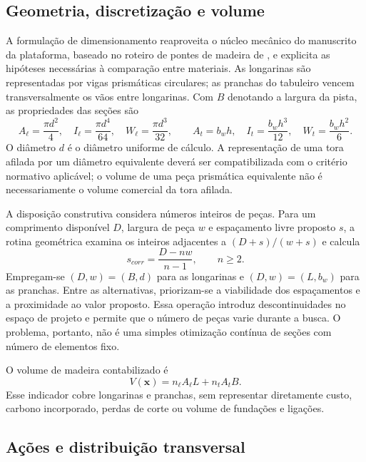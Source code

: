 \subsection{Geometria, discretização e volume}\label{sec:geometria}

A formulação de dimensionamento reaproveita o núcleo mecânico do manuscrito da plataforma, baseado no roteiro de pontes de madeira de \textcite{CALIL2006}, e explicita as hipóteses necessárias à comparação entre materiais. As longarinas são representadas por vigas prismáticas circulares; as pranchas do tabuleiro vencem transversalmente os vãos entre longarinas. Com $B$ denotando a largura da pista, as propriedades das seções são
\begin{equation}
 A_\ell=\frac{\pi d^2}{4},\quad I_\ell=\frac{\pi d^4}{64},\quad
 W_\ell=\frac{\pi d^3}{32},\qquad
 A_t=b_wh,\quad I_t=\frac{b_wh^3}{12},\quad W_t=\frac{b_wh^2}{6}.
\label{eq:secoes}
\end{equation}
O diâmetro $d$ é o diâmetro uniforme de cálculo. A representação de uma tora afilada por um diâmetro equivalente deverá ser compatibilizada com o critério normativo aplicável; o volume de uma peça prismática equivalente não é necessariamente o volume comercial da tora afilada.

A disposição construtiva considera números inteiros de peças. Para um comprimento disponível $D$, largura de peça $w$ e espaçamento livre proposto $s$, a rotina geométrica examina os inteiros adjacentes a $(D+s)/(w+s)$ e calcula
\begin{equation}
 s_{corr}=\frac{D-nw}{n-1},\qquad n\geq2.
\label{eq:acomodacao}
\end{equation}
Empregam-se $(D,w)=(B,d)$ para as longarinas e $(D,w)=(L,b_w)$ para as pranchas. Entre as alternativas, priorizam-se a viabilidade dos espaçamentos e a proximidade ao valor proposto. Essa operação introduz descontinuidades no espaço de projeto e permite que o número de peças varie durante a busca. O problema, portanto, não é uma simples otimização contínua de seções com número de elementos fixo.

O volume de madeira contabilizado é
\begin{equation}
 V(\mathbf{x})=n_\ell A_\ell L+n_t A_t B.
\label{eq:volume_modelo}
\end{equation}
Esse indicador cobre longarinas e pranchas, sem representar diretamente custo, carbono incorporado, perdas de corte ou volume de fundações e ligações.

\subsection{Ações e distribuição transversal}\label{sec:acoes}

